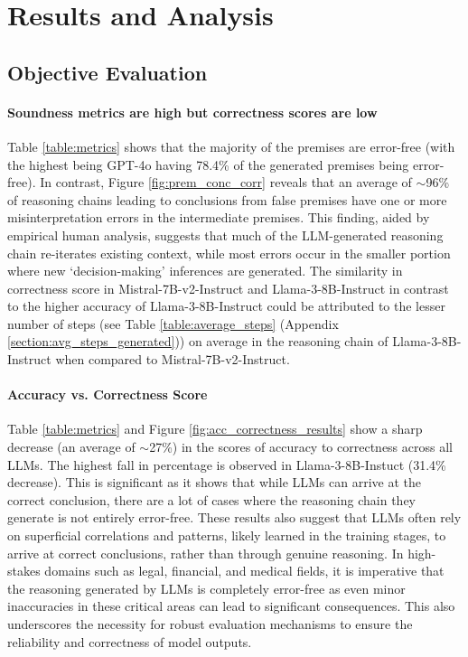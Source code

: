 \section{Results and Analysis}
\label{sec:results}

\subsection{Objective Evaluation}

\paragraph{Soundness metrics are high but correctness scores are low}
Table \ref{table:metrics} shows that the majority of the premises are error-free (with the highest being GPT-4o having 78.4\% of the generated premises being error-free). In contrast, Figure \ref{fig:prem_conc_corr} reveals that an average of $\sim$96\% of reasoning chains leading to conclusions from false premises have one or more misinterpretation errors in the intermediate premises. This finding, aided by empirical human analysis, suggests that much of the LLM-generated reasoning chain re-iterates existing context, while most errors occur in the smaller portion where new `decision-making' inferences are generated. The similarity in correctness score in Mistral-7B-v2-Instruct and Llama-3-8B-Instruct in contrast to the higher accuracy of Llama-3-8B-Instruct could be attributed to the lesser number of steps (see Table \ref{table:average_steps} (Appendix \ref{section:avg_steps_generated})) on average in the reasoning chain of Llama-3-8B-Instruct when compared to Mistral-7B-v2-Instruct. 


\paragraph{Accuracy vs. Correctness Score} Table \ref{table:metrics} and Figure \ref{fig:acc_correctness_results} show a sharp decrease (an average of $\sim$27\%) in the scores of accuracy to correctness across all LLMs. The highest fall in percentage is observed in Llama-3-8B-Instuct (31.4\% decrease). This is significant as it shows that while LLMs can arrive at the correct conclusion, there are a lot of cases where the reasoning chain they generate is not entirely error-free. These results also suggest that LLMs often rely on superficial correlations and patterns, likely learned in the training stages, to arrive at correct conclusions, rather than through genuine reasoning. In high-stakes domains such as legal, financial, and medical fields, it is imperative that the reasoning generated by LLMs is completely error-free as even minor inaccuracies in these critical areas can lead to significant consequences. This also underscores the necessity for robust evaluation mechanisms to ensure the reliability and correctness of model outputs.   

